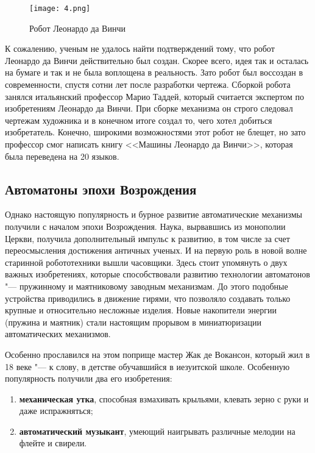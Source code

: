\documentclass[bachelor, och, referat]{SCWorks}
\begin{document}
\begin{figure}[h!]
    \centering
    \texttt{[image: 4.png]}
    \caption{\label{fig:4}%
    Робот Леонардо да Винчи}
\end{figure}

К сожалению, ученым не удалось найти подтверждений тому, что робот Леонардо да
Винчи действительно был создан. Скорее всего, идея так и осталась на бумаге и
так и не была воплощена в реальность. Зато робот был воссоздан в современности,
спустя сотни лет после разработки чертежа. Сборкой робота занялся итальянский
профессор Марио Таддей, который считается экспертом по изобретениям Леонардо да
Винчи. При сборке механизма он строго следовал чертежам художника и в конечном
итоге создал то, чего хотел добиться изобретатель. Конечно, широкими
возможностями этот робот не блещет, но зато профессор смог написать книгу
<<Машины Леонардо да Винчи>>, которая была переведена на 20 языков.

\subsection{Автоматоны эпохи Возрождения}

Однако настоящую популярность и бурное развитие автоматические механизмы
получили с началом эпохи Возрождения. Наука, вырвавшись из монополии Церкви,
получила дополнительный импульс к развитию, в том числе за счет переосмысления
достижения античных ученых. И на первую роль в новой волне старинной
робототехники вышли часовщики. Здесь стоит упомянуть о двух важных изобретениях,
которые способствовали развитию технологии автоматонов "--- пружинному и
маятниковому заводным механизмам. До этого подобные устройства приводились в
движение гирями, что позволяло создавать только крупные и относительно несложные
изделия. Новые накопители энергии (пружина и маятник) стали настоящим прорывом в
миниатюризации автоматических механизмов.

Особенно прославился на этом поприще мастер Жак де Вокансон, который жил в 18
веке "--- к слову, в детстве обучавшийся в иезуитской школе. Особенную
популярность получили два его изобретения:

\begin{enumerate}
    \item \textbf{механическая утка}, способная взмахивать крыльями, клевать
    зерно с руки и даже испражняться;
    \item \textbf{автоматический музыкант}, умеющий наигрывать различные мелодии
    на флейте и свирели.
\end{enumerate}
\end{document}

